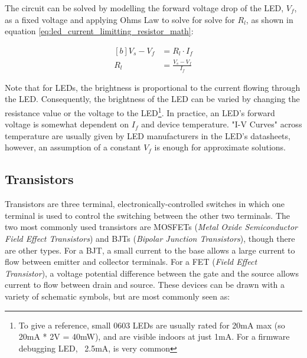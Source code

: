 \documentclass[main.tex]{subfiles}
\begin{document}
\noindent The circuit can be solved by modelling the forward voltage drop of the LED, $V_f$, as a fixed voltage and applying Ohms Law to solve for solve for $R_l$, as shown in equation \eqref{eq:led_current_limitting_resistor_math}:

\begin{equation}
    \begin{aligned}[b]
        V_s - V_f &= R_l \cdot I _f \\
        R_l &= \frac{V_s - V_f}{I_f}
    \end{aligned}
    \label{eq:led_current_limitting_resistor_math}
\end{equation}

\noindent Note that for LEDs, the brightness is proportional to the current flowing through the LED. Consequently, the brightness of the LED can be varied by changing the resistance value or the voltage to the LED\footnote{To give a reference, small 0603 LEDs are usually rated for 20mA max (so 20mA * 2V = 40mW), and are visible indoors at just 1mA. For a firmware debugging LED, ~2.5mA, is very common}. In practice, an LED's forward voltage is somewhat dependent on $I_f$ and device temperature. "I-V Curves" across temperature are usually given by LED manufacturers in the LED's datasheets, however, an assumption of a constant $V_f$ is enough for approximate solutions.

\subsection{Transistors}
Transistors are three terminal, electronically-controlled switches in which one terminal is used to control the switching between the other two terminals. The two most commonly used transistors are MOSFETs (\textit{Metal Oxide Semiconductor Field Effect Transistors}) and BJTs (\textit{Bipolar Junction Transistors}), though there are other types. For a BJT, a small current to the base allows a large current to flow between emitter and collector terminals. For a FET (\textit{Field Effect Transistor}), a voltage potential difference between the gate and the source allows current to flow between drain and source. These devices can be drawn with a variety of schematic symbols, but are most commonly seen as:
\end{document}
